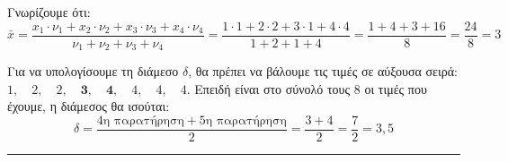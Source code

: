 \begin{alist}
    \item Γνωρίζουμε ότι:
    \[
        \bar{x} = \frac{x_1 \cdot \nu_1 + x_2 \cdot \nu_2 + x_3 \cdot \nu_3 + x_4 \cdot \nu_4}{\nu_1 + \nu_2 + \nu_3 + \nu_4} = \frac{1 \cdot 1 + 2 \cdot 2 + 3 \cdot 1 + 4 \cdot 4}{1+2+1+4} = \frac{1+4+3+16}{8} = \frac{24}{8} = 3
    \]
    \item Για να υπολογίσουμε τη διάμεσο $\delta$, θα πρέπει να βάλουμε τις τιμές σε αύξουσα σειρά: $1, \quad 2, \quad 2, \quad \textbf{3}, \quad \textbf{4}, \quad 4, \quad 4, \quad 4$. Επειδή είναι στο σύνολό τους 8 οι τιμές που έχουμε, η διάμεσος θα ισούται:
    \[
        \delta = \frac{4\text{η παρατήρηση} + 5\text{η παρατήρηση}}{2} = \frac{3+4}{2} = \frac{7}{2} = 3,5
    \]
\end{alist}
\vspace{6mm}
\noindent\rule{\textwidth}{0.4pt}
\vspace{6mm}

